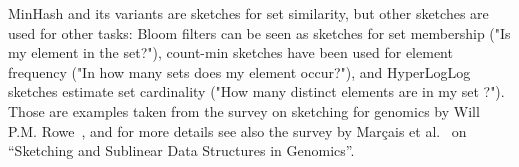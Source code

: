 %
MinHash and its variants are sketches for set similarity, but other sketches are used for other tasks: Bloom filters can be seen as sketches for set membership ("Is my element in the set?"), count-min sketches have been used for element frequency ("In how many sets does my element occur?"), and HyperLogLog sketches estimate set cardinality ("How many distinct elements are in my set ?"). Those are examples taken from the survey on sketching for genomics by Will P.M. Rowe~\cite{rowe2019levee}, and for more details see also the survey by Marçais et al.~\cite{marccais2019sketching} on ``Sketching and Sublinear Data Structures in Genomics''.

